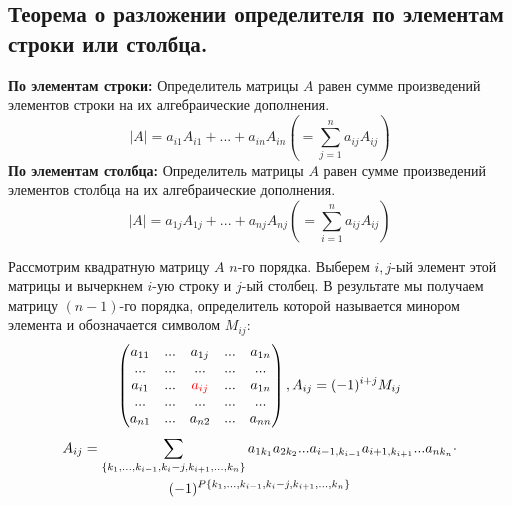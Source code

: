 \documentclass[a4paper,14pt]{article}
\begin{document}
\subsection{Теорема о разложении определителя по элементам строки или столбца.}
\textbf{По элементам строки:}
\noindent Определитель матрицы $A$ равен сумме произведений элементов строки на их алгебраические дополнения.
\[|A|=a_{i1}A_{i1}+...+a_{in}A_{in}\left(=\sum\limits_{j=1}^na_{ij}A_{ij}\right)\]
\textbf{По элементам столбца:}
\noindent Определитель матрицы $A$ равен сумме произведений элементов столбца на их алгебраические дополнения.
\[|A|=a_{1j}A_{1j}+...+a_{nj}A_{nj}\left(=\sum\limits_{i=1}^na_{ij}A_{ij}\right)\]
\begin{remark}
	Рассмотрим квадратную матрицу $A$ $n$-го порядка.   Выберем  $i,j$-ый элемент этой матрицы и вычеркнем $i$-ую строку и $j$-ый столбец. В результате мы получаем матрицу $(n-1)$-го порядка, определитель которой называется минором элемента и обозначается символом $M_{ij}$:
	\[
	\begin{pmatrix}
		a_{11} & ... & a_{1j} & ... & a_{1n} \\
		... & ... & ... & ... & ... \\
		a_{i1} & ... & \textcolor{red} {a_{ij}} & ... & a_{1n} \\
		... & ... & ... & ... & ... \\
		a_{n1} & ... & a_{n2} & ... & a_{nn}
	\end{pmatrix}, A_{ij} = (-1)^{i+j}M_{ij}
	\]
	\begin{multline}
	A_{ij} = \sum\limits_{\{k_1,...,k_{i-1},k_i-j,k_{i+1},...,k_n\}} a_{1k_1}a_{2k_2}...a_{i-1,k_{i-1}}a_{i+1,k_{i+1}}...a_{nk_n} \hm{\cdot} \\ (-1)^{P\{k_1,...,k_{i-1},k_i-j,k_{i+1},...,k_n\}}
	\end{multline}
\end{remark}
\end{document}
